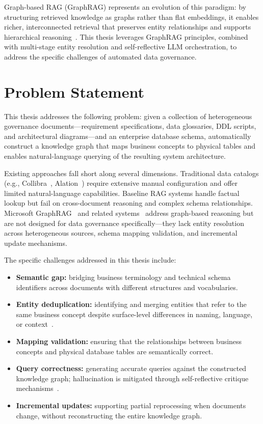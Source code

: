 Graph-based RAG (GraphRAG) represents an evolution of this paradigm: by structuring retrieved knowledge as graphs rather than flat embeddings, it enables richer, interconnected retrieval that preserves entity relationships and supports hierarchical reasoning~\cite{han2025retrievalaugmentedgenerationgraphsgraphrag, peng2024graphretrievalaugmentedgenerationsurvey}. This thesis leverages GraphRAG principles, combined with multi-stage entity resolution and self-reflective LLM orchestration, to address the specific challenges of automated data governance.

\section{Problem Statement}
\label{sec:intro:problem}

This thesis addresses the following problem: given a collection of heterogeneous governance documents---requirement specifications, data glossaries, DDL scripts, and architectural diagrams---and an enterprise database schema, automatically construct a knowledge graph that maps business concepts to physical tables and enables natural-language querying of the resulting system architecture.

Existing approaches fall short along several dimensions. Traditional data catalogs (e.g., Collibra~\cite{collibra2025}, Alation~\cite{alation2025}) require extensive manual configuration and offer limited natural-language capabilities. Baseline RAG systems handle factual lookup but fail on cross-document reasoning and complex schema relationships. Microsoft GraphRAG~\cite{edge2025localglobalgraphrag} and related systems~\cite{hu2025graggraphretrievalaugmentedgeneration} address graph-based reasoning but are not designed for data governance specifically---they lack entity resolution across heterogeneous sources, schema mapping validation, and incremental update mechanisms.

The specific challenges addressed in this thesis include:
\begin{itemize}
    \item \textbf{Semantic gap:} bridging business terminology and technical schema identifiers across documents with different structures and vocabularies.
    \item \textbf{Entity deduplication:} identifying and merging entities that refer to the same business concept despite surface-level differences in naming, language, or context~\cite{kejriwal2023namedentityresolutionpersonal}.
    \item \textbf{Mapping validation:} ensuring that the relationships between business concepts and physical database tables are semantically correct.
    \item \textbf{Query correctness:} generating accurate queries against the constructed knowledge graph; hallucination is mitigated through self-reflective critique mechanisms~\cite{asai2023selfraglearningretrievegenerate}.
    \item \textbf{Incremental updates:} supporting partial reprocessing when documents change, without reconstructing the entire knowledge graph.
\end{itemize}

